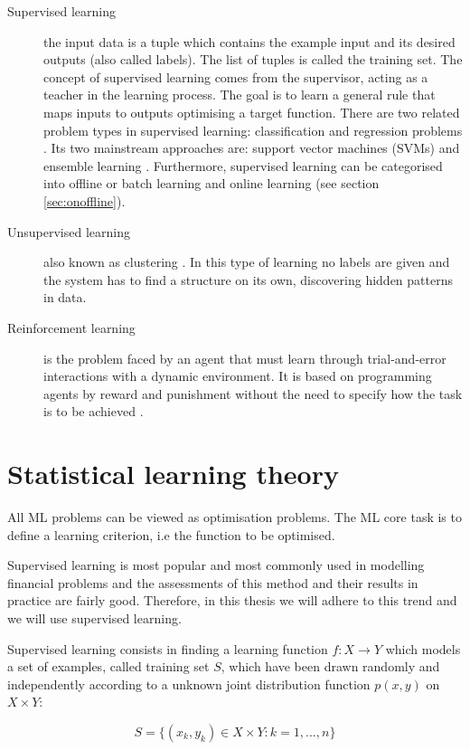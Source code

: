 \begin{description}
\item[Supervised learning]  the input data is a tuple which contains the example
input and its desired outputs (also called labels). The list of tuples is called
the training set. The concept of supervised learning comes from the supervisor,
acting as a teacher in the learning process. The goal is to learn a general rule
that maps inputs to outputs optimising a target function. There are two related
problem types in supervised learning: classification and regression problems
\cite{bishop2006}. Its two mainstream approaches are: support vector machines
(SVMs) \cite{vapnik1998} and ensemble learning \cite{breiman1998}. Furthermore,
supervised learning can be categorised into offline or batch learning and online
learning (see section \ref{sec:onoffline}). 
\item[Unsupervised learning] also known as clustering \cite{ben2005}. In this
type of learning no labels are given and the system has to find a structure on
its own, discovering hidden patterns in data.
\item[Reinforcement learning] is the problem faced by an agent that must learn
through trial-and-error interactions with a dynamic environment. It is based on
programming agents by reward and punishment without the need to specify how the
task is to be achieved \cite{sutton1998}.
\end{description}


\section{Statistical learning theory} \label{sec:mltheory}

All ML problems can be viewed as optimisation problems. The ML core task is to
define a learning criterion, i.e the function to be optimised. 

Supervised learning is most popular and most commonly used in modelling
financial problems and the assessments of this method and their results in
practice are fairly good. Therefore, in this thesis we will adhere to this trend
and we will use supervised learning.

Supervised learning consists in finding a learning function $f: X \rightarrow Y$
which models a set of examples, called training set $S$, which have been drawn
randomly and independently according to a unknown joint distribution function
$p(x,y)$ on $X \times Y$:


$$
S = \{ (x_k,y_k)\in X\times Y : k=1,...,n \}
$$

